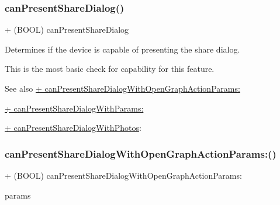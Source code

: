 \subsubsection{\texorpdfstring{can\+Present\+Share\+Dialog()}{canPresentShareDialog()}\hspace{0.1cm}{\footnotesize\ttfamily [5/5]}}
{\footnotesize\ttfamily + (B\+O\+OL) can\+Present\+Share\+Dialog \begin{DoxyParamCaption}{ }\end{DoxyParamCaption}}

Determines if the device is capable of presenting the share dialog.

This is the most basic check for capability for this feature.

\begin{DoxySeeAlso}{See also}
\hyperlink{interfaceFBDialogs_ad8921a3906d28210cad0c0871e99f4bd}{+ can\+Present\+Share\+Dialog\+With\+Open\+Graph\+Action\+Params\+:} 

\hyperlink{interfaceFBDialogs_a36e9e390bb8c6040e6027b647ed587e8}{+ can\+Present\+Share\+Dialog\+With\+Params\+:} 

\hyperlink{interfaceFBDialogs_a16156d6a4664e4ea55e351bc78b6e8a7}{+ can\+Present\+Share\+Dialog\+With\+Photos}\+: 
\end{DoxySeeAlso}
\mbox{\label{interfaceFBDialogs_ad8921a3906d28210cad0c0871e99f4bd}} 
\subsubsection{\texorpdfstring{can\+Present\+Share\+Dialog\+With\+Open\+Graph\+Action\+Params\+:()}{canPresentShareDialogWithOpenGraphActionParams:()}\hspace{0.1cm}{\footnotesize\ttfamily [1/5]}}
{\footnotesize\ttfamily + (B\+O\+OL) can\+Present\+Share\+Dialog\+With\+Open\+Graph\+Action\+Params\+: \begin{DoxyParamCaption}\item[{(\hyperlink{interfaceFBOpenGraphActionParams}{F\+B\+Open\+Graph\+Action\+Params} $\ast$)}]{params }\end{DoxyParamCaption}}


